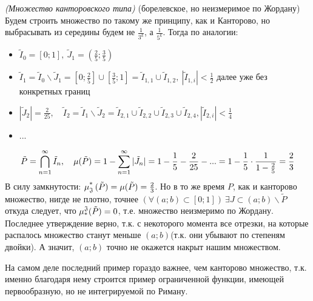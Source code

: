 \begin{example}
	\textit{(Множество канторовского типа)} (борелевское, но неизмеримое по Жордану) Будем строить множество по такому же принципу, как и Канторово, но выбрасывать из середины будем не $\frac{1}{3^k}$, а $\frac{1}{5^k}$. Тогда по аналогии:
	\begin{itemize}
		\item $\tilde{I}_0 = [0;1],\ \tilde{J}_1=(\frac{2}{5};\frac{3}{5})$
		\item
		$\tilde{I}_1 =\tilde{I}_0 \backslash \tilde{J}_1=[0;\frac{2}{5}]\cup[\frac{3}{5};1] = \tilde{I}_{1,1}\cup\tilde{I}_{1,2},\  |\tilde{I}_{1, i}| <\frac{1}{2}$  далее уже без конкретных границ
		\item $|\tilde{J}_2| = \frac{2}{25},\quad \tilde{I}_2=\tilde{I}_1 \backslash \tilde{J}_2= \tilde{I}_{2, 1}\cup\tilde{I}_{2, 2}\cup\tilde{I}_{2, 3}\cup\tilde{I}_{2, 4}, |\tilde{I}_{2, i}|<\frac{1}{4}$
		\item ...
	\end{itemize}
	\[
		\tilde{P}=\bigcap\limits_{n=1}^\infty\tilde{I}_n,\quad \mu(\tilde{P}) = 1 -\sum\limits_{n=1}^\infty|\tilde{J}_n| = 1 -\frac{1}{5} - \frac{2}{25}-...=1-\frac{1}{5}\cdot\frac{1}{1-\frac{2}{5}} = \frac{2}{3}
	\]
	В силу замкнутости: $\operatorname{\mu^*_\mathfrak{J}}{(\tilde{P})} = \mu(\tilde{P}) = \frac{2}{3}$. Но в то же время $P$, как и канторово множество, нигде не плотно, точнее $(\forall(a;b)\subset[0;1])\ \exists J\subset(a;b)\backslash \tilde{P}$ откуда следует, что $\operatorname{\mu^\mathfrak{J}_*}(\tilde{P}) = 0$, т.е. множество неизмеримо по Жордану. Последнее утверждение верно, т.к. с некоторого момента все отрезки, на которые распалось множество станут меньше $(a;b)$(т.к. они убывают по степеням двойки). А значит, $(a;b)$ точно не окажется накрыт нашим множеством.
\end{example}

\begin{note}
	На самом деле последний пример гораздо важнее, чем канторово множество, т.к. именно благодаря нему строится пример ограниченной функции, имеющей первообразную, но не интегрируемой по Риману.
\end{note}